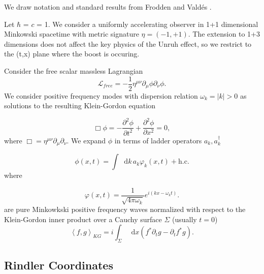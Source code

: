 \documentclass[12pt,a4paper]{article}
\newcommand*\diff{\mathop{}\!\mathrm{d}}
\begin{document}
We draw notation and standard results from Frodden and Vald{\'{e}}s \cite{Frodden}.


Let $\hbar$ = $c$ = 1. We consider a uniformly accelerating observer in 1+1 dimensional Minkowski spacetime with metric signature $\eta=(-1,+1)$. The extension to 1+3 dimensions does not affect the key physics of the Unruh effect, so we restrict to the (t,x) plane where the boost is occuring.

Consider the free scalar massless Lagrangian
\begin{equation}
\mathscr{L}_{free} = -\frac{1}{2} \eta^{\mu\nu}\partial_\mu \phi \partial_\nu \phi.
\end{equation}
We consider positive frequency modes with dispersion relation $\omega_k = |k| > 0$ as solutions to the resulting Klein-Gordon equation 

\begin{equation}
  \Box \phi = -\frac{\partial^2 \phi}{\partial t^2} + \frac{\partial^2 \phi}{\partial x^2} = 0,
 \label{massless-wave-eq}
\end{equation}
where $\Box = \eta^{\mu\nu} \partial_\mu \partial_\nu$. We expand $\phi$ in terms of ladder operators $a_k, a_k^\dagger$

\begin{equation}
  \phi(x,t) = \int \diff k \, a_k \varphi_k(x,t) + \text{h.c.}
\end{equation}
where

\begin{equation}
  \varphi(x,t) = \frac{1}{\sqrt{4\pi\omega_k}} e^{i(kx - \omega_k t)}.
\label{amode}
\end{equation}
are pure Minkowkski positive frequency waves normalized with respect to the Klein-Gordon inner product over a Cauchy surface $\Sigma$ (usually $t = 0$)
\begin{equation}
  \left<f, g\right>_{KG} = i \int_\Sigma \diff x (f^* \partial_t g - \partial_t f^* g).
\end{equation}

\subsection{Rindler Coordinates}
\end{document}

